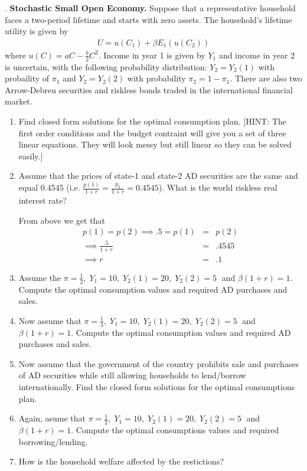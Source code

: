 \documentclass[11pt]{SelfArxOneColBMN}
\affiliation{\textsuperscript{1}\textit{John E. Walker Department of Economics,
Clemson University,Clemson, SC: email ijdavis@g.clemson.edu}}
\date{\small{Version ~\today}}
\begin{document}
\flushbottom

\maketitle

\renewcommand{\theexercise}{\arabic{exercise}}

. \textbf{Stochastic Small Open Economy.} Suppose that a representative household faces a two-period lifetime and starts with zero assets. The household's lifetime utility is given by
\begin{eqnarray*}
  U = u(C_1) + \beta E_1(u(C_2))
\end{eqnarray*}
where $u(C) = aC - \frac{b}{2}C^2$. Income in year 1 is given by $Y_1$ and income in year 2 is uncertain, with the following probability distribution: $Y_2 = Y_2(1)$ with probaility of $\pi_1$ and $Y_2 = Y_2(2)$ with probability $\pi_2 = 1 - \pi_1$. There are also two Arrow-Debreu securities and riskless bonds traded in the international financial market.
\begin{enumerate}
  \item Find closed form solutions for the optimal consumption plan. [HINT: The first order conditions and the budget contraint will give you a set of three linear equations. They will look messy but still linear so they can be solved easily.]
  \item Assume that the prices of state-1 and state-2 AD securities are the same and equal 0.4545 (i.e. $\frac{p(1)}{1 + r} = \frac{p_2}{1 + r} = 0.4545$). What is the world riskless real interest rate?
  \begin{solution}
    From above we get that 
    \begin{eqnarray*}
      p(1) = p(2) \implies .5 = p(1) &=& p(2)\\
      \implies \frac{.5}{1 + r} &=& .4545\\
      \implies r &=& .1
    \end{eqnarray*}
  \end{solution}
  \item Assume the $\pi = \frac{1}{2}, \; Y_1 = 10, \; Y_2(1) = 20, \; Y_2(2) = 5 \; $ and $\beta(1 + r) = 1$. Compute the optimal consumption values and required AD purchases and sales.
  \item Now assume that $\pi = \frac{1}{3}, \; Y_1 = 10, \; Y_2(1) = 20, \; Y_2(2) = 5 \; $ and $\beta(1 + r) = 1$. Compute the optimal consumption values and required AD purchases and sales.
  \item Now assume that the government of the country prohibits sale and purchases of AD securities while still allowing households to lend/borrow internationally. Find the closed form solutions for the optimal consumptions plan.
  \item Again, asume that $\pi = \frac{1}{2}, \; Y_1 = 10, \; Y_2(1) = 20, \; Y_2(2) = 5 \; $ and $\beta(1 + r) = 1$. Compute the optimal consumptions values and required borrowing/lending.
  \item How is the household welfare affected by the restictions? 
\end{enumerate}
\end{document}
